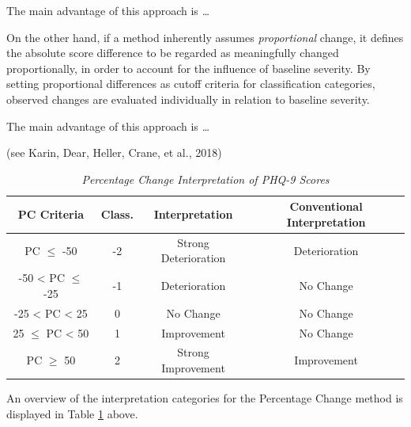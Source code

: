 \documentclass[12pt,twoside]{reedthesis}
\begin{document}
The main advantage of this approach is \emph{\ldots{}}

\par

On the other hand, if a method inherently assumes \emph{proportional} change, it defines the absolute score difference to be regarded as meaningfully changed proportionally, in order to account for the influence of baseline severity. By setting proportional differences as cutoff criteria for classification categories, observed changes are evaluated individually in relation to baseline severity.

The main advantage of this approach is \emph{\ldots{}}

(see Karin, Dear, Heller, Crane, et al., 2018)

\par
\begin{table}[htb]
\vspace*{1.5em}
\begin{threeparttable}
  \caption{\textit{Percentage Change Interpretation of PHQ-9 Scores}}
  \label{tab:pc-int}
  \begin{tabular}{@{}cccc@{}}
  \toprule
  PC Criteria & Class. & Interpretation & Conventional Interpretation\\ \midrule
  PC $\leq$ -50 & -2 & Strong Deterioration & Deterioration\\
  -50 < PC $\leq$ -25 & -1 & Deterioration & No Change\\
  -25 < PC < 25 & 0 & No Change & No Change\\
  25 $\leq$ PC < 50 & 1 & Improvement & No Change\\
  PC $\geq$ 50 & 2 & Strong Improvement & Improvement\\
  \bottomrule
  \end{tabular}
\end{threeparttable}
\end{table}
An overview of the interpretation categories for the Percentage Change method is displayed in Table \ref{tab:pc-int} above.
\end{document}
